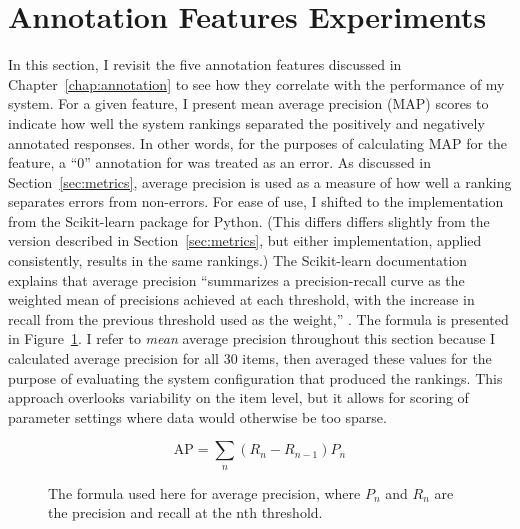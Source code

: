 \section{Annotation Features Experiments}
\label{sec:exp-annotations}
In this section, I revisit the five annotation features discussed in Chapter~\ref{chap:annotation} to see how they correlate with the performance of my system. For a given feature, I present mean average precision (MAP) scores to indicate how well the system rankings separated the positively and negatively annotated responses. In other words, for the purposes of calculating MAP for the  feature, a ``0'' annotation for  was treated as an error. As discussed in Section~\ref{sec:metrics}, average precision is used as a measure of how well a ranking separates errors from non-errors. For ease of use, I shifted to the  implementation from the Scikit-learn package for Python. (This differs differs slightly from the version described in Section~\ref{sec:metrics}, but either implementation, applied consistently, results in the same rankings.) The Scikit-learn documentation explains that average precision ``summarizes a precision-recall curve as the weighted mean of precisions achieved at each threshold, with the increase in recall from the previous threshold used as the weight,'' \cite{scikit-learn}. The formula is presented in Figure~\ref{fig:exp-ap}. I refer to \textit{mean} average precision throughout this section because I calculated average precision for all 30 items, then averaged these values for the purpose of evaluating the system configuration that produced the rankings. This approach overlooks variability on the item level, but it allows for scoring of parameter settings where data would otherwise be too sparse.



\begin{figure}[htb!]
\begin{center}
\[
\text{AP} = {\sum_n (R_n - R_{n-1}) P_n}
\]
\caption{\label{fig:exp-ap} The formula used here for average precision, where $P_n$ and $R_n$ are the precision and recall at the nth threshold.}
\end{center}
\end{figure}




